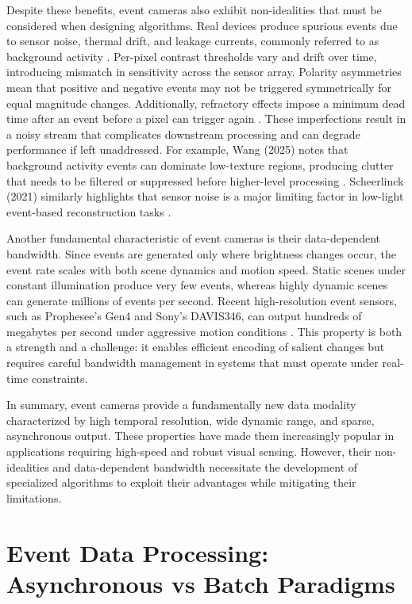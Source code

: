 Despite these benefits, event cameras also exhibit non-idealities that must be considered when designing algorithms. Real devices produce spurious events due to sensor noise, thermal drift, and leakage currents, commonly referred to as background activity \cite{Gallego2020Survey}. Per-pixel contrast thresholds vary and drift over time, introducing mismatch in sensitivity across the sensor array. Polarity asymmetries mean that positive and negative events may not be triggered symmetrically for equal magnitude changes. Additionally, refractory effects impose a minimum dead time after an event before a pixel can trigger again \cite{Delbruck2020}. These imperfections result in a noisy stream that complicates downstream processing and can degrade performance if left unaddressed. For example, Wang (2025) notes that background activity events can dominate low-texture regions, producing clutter that needs to be filtered or suppressed before higher-level processing \cite{Wang2025Thesis}. Scheerlinck (2021) similarly highlights that sensor noise is a major limiting factor in low-light event-based reconstruction tasks \cite{Scheerlinck2021Thesis}.

Another fundamental characteristic of event cameras is their data-dependent bandwidth. Since events are generated only where brightness changes occur, the event rate scales with both scene dynamics and motion speed. Static scenes under constant illumination produce very few events, whereas highly dynamic scenes can generate millions of events per second. Recent high-resolution event sensors, such as Prophesee’s Gen4 and Sony’s DAVIS346, can output hundreds of megabytes per second under aggressive motion conditions \cite{Finateu2020ISSCC}. This property is both a strength and a challenge: it enables efficient encoding of salient changes but requires careful bandwidth management in systems that must operate under real-time constraints.

In summary, event cameras provide a fundamentally new data modality characterized by high temporal resolution, wide dynamic range, and sparse, asynchronous output. These properties have made them increasingly popular in applications requiring high-speed and robust visual sensing. However, their non-idealities and data-dependent bandwidth necessitate the development of specialized algorithms to exploit their advantages while mitigating their limitations.

\section{Event Data Processing: Asynchronous vs Batch Paradigms}

